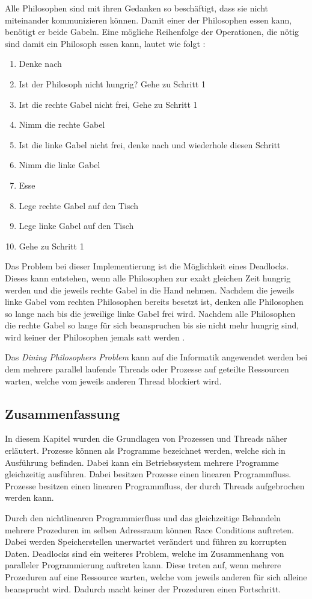 Alle Philosophen sind mit ihren Gedanken so beschäftigt, dass sie nicht miteinander kommunizieren können. Damit einer der Philosophen essen kann, benötigt er beide Gabeln. Eine mögliche Reihenfolge der Operationen, die nötig sind damit ein Philosoph essen kann, lautet wie folgt \cite[p. 21]{dij71}:

\begin{enumerate}
  \item Denke nach
  \item Ist der Philosoph nicht hungrig? Gehe zu Schritt 1
  \item Ist die rechte Gabel nicht frei, Gehe zu Schritt 1
  \item Nimm die rechte Gabel
  \item Ist die linke Gabel nicht frei, denke nach und wiederhole diesen Schritt
  \item Nimm die linke Gabel
  \item Esse
  \item Lege rechte Gabel auf den Tisch  
  \item Lege linke Gabel auf den Tisch
  \item Gehe zu Schritt 1
\end{enumerate}

Das Problem bei dieser Implementierung ist die Möglichkeit eines Deadlocks. Dieses kann entstehen, wenn alle Philosophen zur exakt gleichen Zeit hungrig werden und die jeweils rechte Gabel in die Hand nehmen. Nachdem die jeweils linke Gabel vom rechten Philosophen bereits besetzt ist, denken alle Philosophen so lange nach bis die jeweilige linke Gabel frei wird. Nachdem alle Philosophen die rechte Gabel so lange für sich beanspruchen bis sie nicht mehr hungrig sind, wird keiner der Philosophen jemals satt werden \cite[p. 21]{dij71}. 

Das \emph{Dining Philosophers Problem} kann auf die Informatik angewendet werden bei dem mehrere parallel laufende Threads oder Prozesse auf geteilte Ressourcen warten, welche vom jeweils anderen Thread blockiert wird.

\subsection{Zusammenfassung}
In diesem Kapitel wurden die Grundlagen von Prozessen und Threads näher erläutert. Prozesse können als Programme bezeichnet werden, welche sich in Ausführung befinden. Dabei kann ein Betriebssystem mehrere Programme gleichzeitig ausführen. Dabei besitzen Prozesse einen linearen Programmfluss. Prozesse besitzen einen linearen Programmfluss, der durch Threads aufgebrochen werden kann.

Durch den nichtlinearen Programmierfluss und das gleichzeitige Behandeln mehrere Prozeduren im selben Adressraum können Race Conditions auftreten. Dabei werden Speicherstellen unerwartet verändert und führen zu korrupten Daten. Deadlocks sind ein weiteres Problem, welche im Zusammenhang von paralleler Programmierung auftreten kann. Diese treten auf, wenn mehrere Prozeduren auf eine Ressource warten, welche vom jeweils anderen für sich alleine beansprucht wird. Dadurch macht keiner der Prozeduren einen Fortschritt. 